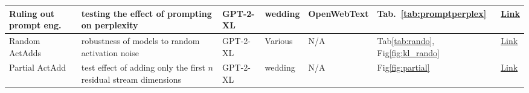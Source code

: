 \begin{table}[h!t]
\begin{tabular}{p{1.9cm}|p{2.5cm}lllll}
Ruling out prompt eng.  & \small testing the effect of prompting on perplexity & \small GPT-2-XL & \small wedding & \small OpenWebText & \small Tab.~\ref{tab:promptperplex} & \underline{\href{
https://zenodo.org/records/13879423
}{Link}}
\\\hline
Random \!ActAdds  & \small robustness of models to random activation noise & \small GPT-2-XL & \small Various & \small N/A & \small Tab\ref{tab:rando}, Fig\ref{fig:kl_rando} & \underline{\href{
https://zenodo.org/records/13879423
}{Link}}
\\\hline
Partial \!ActAdd  & \small test effect of adding only the first $n$ residual stream dimensions & \small GPT-2-XL & \small wedding & \small N/A & \small Fig\ref{fig:partial} & \underline{\href{
https://zenodo.org/records/13879423
}{Link}} \\\hline
\bottomrule
\end{tabular}
\label{tab:experiments}
\end{table}




\clearpage